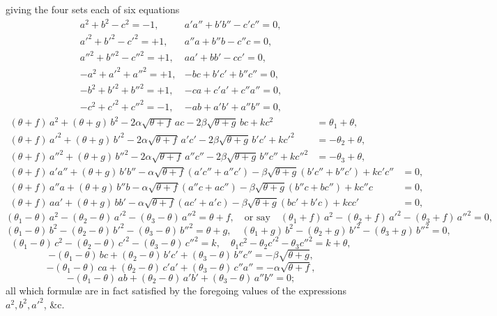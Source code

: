 \documentclass[11pt,a4paper]{article}
\begin{document}
\noindent giving the four sets each of six equations
\[
\begin{array}{ll}
a^{2} + b^{2} - c^{2} = -1, & a'a'' + b'b'' - c'c'' = 0,\\
a'^{2} + b'^{2} - c'^{2} = +1, & a''a + b''b - c''c = 0,\\
a''^{2} + b''^{2} - c''^{2} = +1, & aa' + bb' - cc' = 0,\\[2pt]
-a^{2} + a'^{2} + a''^{2} = +1, & -bc + b'c' + b''c'' = 0,\\
-b^{2} + b'^{2} + b''^{2} = +1, & -ca + c'a' + c''a'' = 0,\\
-c^{2} + c'^{2} + c''^{2} = -1, & -ab + a'b' + a''b'' = 0,
\end{array}
\]
\begin{align*}
(\theta + f)\,a^{2} + (\theta + g)\,b^{2} - 2\alpha\sqrt{\theta + f}\,ac - 2\beta\sqrt{\theta + g}\,bc + kc^{2} &= \theta_{1} + \theta,\\
(\theta + f)\,a'^{2} + (\theta + g)\,b'^{2} - 2\alpha\sqrt{\theta + f}\,a'c' - 2\beta\sqrt{\theta + g}\,b'c' + kc'^{2} &= -\theta_{2} + \theta,\\
(\theta + f)\,a''^{2} + (\theta + g)\,b''^{2} - 2\alpha\sqrt{\theta + f}\,a''c'' - 2\beta\sqrt{\theta + g}\,b''c'' + kc''^{2} &= -\theta_{3} + \theta,
\end{align*}
\begin{align*}
(\theta + f)\,a'a'' + (\theta + g)\,b'b'' - \alpha\sqrt{\theta + f}(a'c'' + a''c') - \beta\sqrt{\theta + g}(b'c'' + b''c') + kc'c'' &= 0,\\
(\theta + f)\,a''a + (\theta + g)\,b''b - \alpha\sqrt{\theta + f}(a''c + ac'') - \beta\sqrt{\theta + g}(b''c + bc'') + kc''c &= 0,\\
(\theta + f)\,aa' + (\theta + g)\,bb' - \alpha\sqrt{\theta + f}(ac' + a'c) - \beta\sqrt{\theta + g}(bc' + b'c) + kcc' &= 0,
\end{align*}
\[
(\theta_{1} - \theta)\,a^{2} - (\theta_{2} - \theta)\,a'^{2} - (\theta_{3} - \theta)\,a''^{2} = \theta + f, \quad \text{or say}\quad (\theta_{1} + f)\,a^{2} - (\theta_{2} + f)\,a'^{2} - (\theta_{3} + f)\,a''^{2} = 0,
\]
\[
(\theta_{1} - \theta)\,b^{2} - (\theta_{2} - \theta)\,b'^{2} - (\theta_{3} - \theta)\,b''^{2} = \theta + g, \quad (\theta_{1} + g)\,b^{2} - (\theta_{2} + g)\,b'^{2} - (\theta_{3} + g)\,b''^{2} = 0,
\]
\[
(\theta_{1} - \theta)\,c^{2} - (\theta_{2} - \theta)\,c'^{2} - (\theta_{3} - \theta)\,c''^{2} = k, \quad \theta_{1}c^{2} - \theta_{2}c'^{2} - \theta_{3}c''^{2} = k + \theta,
\]
\[
-(\theta_{1} - \theta)\,bc + (\theta_{2} - \theta)\,b'c' + (\theta_{3} - \theta)\,b''c'' = -\beta\sqrt{\theta + g},
\]
\[
-(\theta_{1} - \theta)\,ca + (\theta_{2} - \theta)\,c'a' + (\theta_{3} - \theta)\,c''a'' = -\alpha\sqrt{\theta + f},
\]
\[
-(\theta_{1} - \theta)\,ab + (\theta_{2} - \theta)\,a'b' + (\theta_{3} - \theta)\,a''b'' = 0;
\]
all which formul\ae{} are in fact satisfied by the foregoing values of the expressions $a^{2}, b^{2}, a'^{2}$, \&c.
\end{document}
